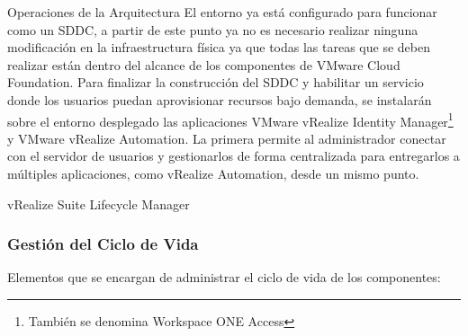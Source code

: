 \begin{subsection}{Operaciones de la Arquitectura}
    El entorno ya está configurado para funcionar como un SDDC, a partir de este punto ya no es necesario realizar ninguna modificación en la infraestructura física ya que todas las tareas que se deben realizar están dentro del alcance de los componentes de VMware Cloud Foundation. Para finalizar la construcción del SDDC y habilitar un servicio donde los usuarios puedan aprovisionar recursos bajo demanda, se instalarán sobre el entorno desplegado las aplicaciones VMware vRealize Identity Manager\footnote{También se denomina Workspace ONE Access} y VMware vRealize Automation. La primera permite al administrador conectar con el servidor de usuarios y gestionarlos de forma centralizada para entregarlos a múltiples aplicaciones, como vRealize Automation, desde un mismo punto.
    
    \begin{subsubsection}{vRealize Suite Lifecycle Manager}
        
    \end{subsubsection}
    \subsubsection{Gestión del Ciclo de Vida}
    Elementos que se encargan de administrar el ciclo de vida de los componentes:
    \begin{itemize}
        

\end{itemize}
\end{subsection}
